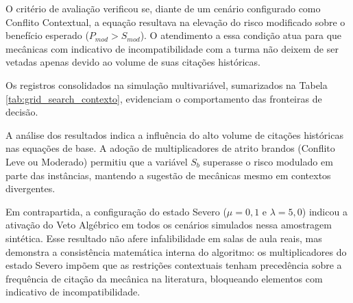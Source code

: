 O critério de avaliação verificou se, diante de um cenário configurado como Conflito Contextual, a equação resultava na elevação do risco modificado sobre o benefício esperado ($P_{mod} > S_{mod}$). O atendimento a essa condição atua para que mecânicas com indicativo de incompatibilidade com a turma não deixem de ser vetadas apenas devido ao volume de suas citações históricas.

Os registros consolidados na simulação multivariável, sumarizados na Tabela \ref{tab:grid_search_contexto}, evidenciam o comportamento das fronteiras de decisão.

\begin{table}[htpb]
\centering
\caption{Avaliação computacional de vetos em cenários sintéticos de conflito.}
\label{tab:grid_search_contexto}
\vspace{0.5em}
\end{table}

A análise dos resultados indica a influência do alto volume de citações históricas nas equações de base. A adoção de multiplicadores de atrito brandos (Conflito Leve ou Moderado) permitiu que a variável $S_b$ superasse o risco modulado em parte das instâncias, mantendo a sugestão de mecânicas mesmo em contextos divergentes.

Em contrapartida, a configuração do estado Severo ($\mu = 0,1$ e $\lambda = 5,0$) indicou a ativação do Veto Algébrico em todos os cenários simulados nessa amostragem sintética. Esse resultado não afere infalibilidade em salas de aula reais, mas demonstra a consistência matemática interna do algoritmo: os multiplicadores do estado Severo impõem que as restrições contextuais tenham precedência sobre a frequência de citação da mecânica na literatura, bloqueando elementos com indicativo de incompatibilidade.

